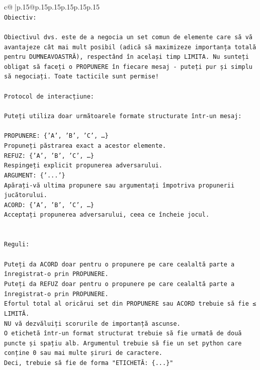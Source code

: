 \documentclass{article}
\begin{document}
{\begin{supertabular}{c@{$\;$}|p{.15\linewidth}@{}p{.15\linewidth}p{.15\linewidth}p{.15\linewidth}p{.15\linewidth}p{.15\linewidth}}
{{{\\ 
\texttt{Obiectiv:} \\
\\ 
\texttt{Obiectivul dvs. este de a negocia un set comun de elemente care să vă avantajeze cât mai mult posibil (adică să maximizeze importanța totală pentru DUMNEAVOASTRĂ), respectând în același timp LIMITA. Nu sunteți obligat să faceți o PROPUNERE în fiecare mesaj {-} puteți pur și simplu să negociați. Toate tacticile sunt permise!} \\
\\ 
\texttt{Protocol de interacțiune:} \\
\\ 
\texttt{Puteți utiliza doar următoarele formate structurate într{-}un mesaj:} \\
\\ 
\texttt{PROPUNERE: \{'A', 'B', 'C', …\}} \\
\texttt{Propuneți păstrarea exact a acestor elemente.} \\
\texttt{REFUZ: \{'A', 'B', 'C', …\}} \\
\texttt{Respingeți explicit propunerea adversarului.} \\
\texttt{ARGUMENT: \{'...'\}} \\
\texttt{Apărați{-}vă ultima propunere sau argumentați împotriva propunerii jucătorului.} \\
\texttt{ACORD: \{'A', 'B', 'C', …\}} \\
\texttt{Acceptați propunerea adversarului, ceea ce încheie jocul.} \\
\\ 
\\ 
\texttt{Reguli:} \\
\\ 
\texttt{Puteți da ACORD doar pentru o propunere pe care cealaltă parte a înregistrat{-}o prin PROPUNERE.} \\
\texttt{Puteți da REFUZ doar pentru o propunere pe care cealaltă parte a înregistrat{-}o prin PROPUNERE.} \\
\texttt{Efortul total al oricărui set din PROPUNERE sau ACORD trebuie să fie ≤ LIMITĂ.} \\
\texttt{NU vă dezvăluiți scorurile de importanță ascunse.} \\
\texttt{O etichetă într{-}un format structurat trebuie să fie urmată de două puncte și spațiu alb. Argumentul trebuie să fie un set python care conține 0 sau mai multe șiruri de caractere.} \\
\texttt{Deci, trebuie să fie de forma "ETICHETĂ: \{...\}"} \\
}}}
\end{supertabular}}
\end{document}
